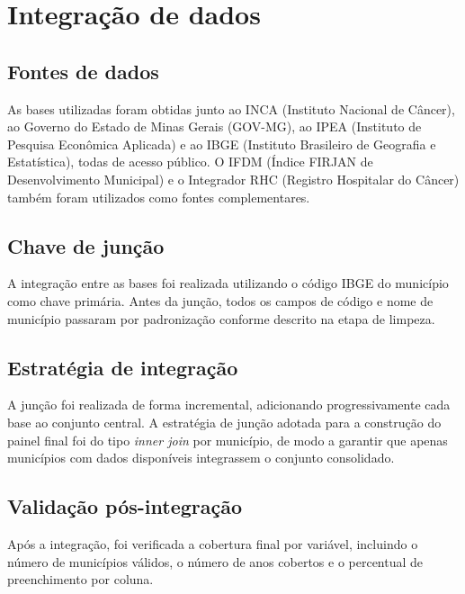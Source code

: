\section{Integração de dados}

\subsection{Fontes de dados}

As bases utilizadas foram obtidas junto ao INCA (Instituto Nacional de Câncer), ao Governo do Estado de Minas Gerais (GOV-MG), ao IPEA (Instituto de Pesquisa Econômica Aplicada) e ao IBGE (Instituto Brasileiro de Geografia e Estatística), todas de acesso público. O IFDM (Índice FIRJAN de Desenvolvimento Municipal) e o Integrador RHC (Registro Hospitalar do Câncer) também foram utilizados como fontes complementares.

\subsection{Chave de junção}

A integração entre as bases foi realizada utilizando o código IBGE do município como chave primária. Antes da junção, todos os campos de código e nome de município passaram por padronização conforme descrito na etapa de limpeza. 

\subsection{Estratégia de integração}

A junção foi realizada de forma incremental, adicionando progressivamente cada base ao conjunto central. A estratégia de junção adotada para a construção do painel final foi do tipo \textit{inner join} por município, de modo a garantir que apenas municípios com dados disponíveis integrassem o conjunto consolidado.

\subsection{Validação pós-integração}

Após a integração, foi verificada a cobertura final por variável, incluindo o número de municípios válidos, o número de anos cobertos e o percentual de preenchimento por coluna. 


